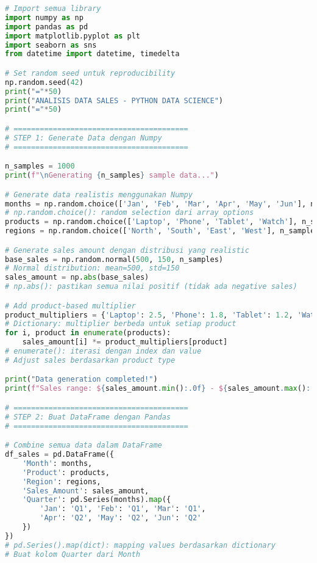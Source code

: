 \begin{lstlisting}[language=python, caption={Contoh Analisis Data Sales Lengkap}, style=python]
# Import semua library
import numpy as np
import pandas as pd
import matplotlib.pyplot as plt
import seaborn as sns
from datetime import datetime, timedelta

# Set random seed untuk reproducibility
np.random.seed(42)
print("="*50)
print("ANALISIS DATA SALES - PYTHON DATA SCIENCE")
print("="*50)

# ========================================
# STEP 1: Generate Data dengan Numpy
# ========================================

n_samples = 1000
print(f"\nGenerating {n_samples} sample data...")

# Generate data realistis menggunakan Numpy
months = np.random.choice(['Jan', 'Feb', 'Mar', 'Apr', 'May', 'Jun'], n_samples)
# np.random.choice(): random selection dari array options
products = np.random.choice(['Laptop', 'Phone', 'Tablet', 'Watch'], n_samples)
regions = np.random.choice(['North', 'South', 'East', 'West'], n_samples)

# Generate sales amount dengan distribusi yang realistic
base_sales = np.random.normal(500, 150, n_samples)
# Normal distribution: mean=500, std=150
sales_amount = np.abs(base_sales)
# np.abs(): pastikan semua nilai positif (tidak ada negative sales)

# Add product-based multiplier
product_multipliers = {'Laptop': 2.5, 'Phone': 1.8, 'Tablet': 1.2, 'Watch': 0.8}
# Dictionary: multiplier berbeda untuk setiap product
for i, product in enumerate(products):
    sales_amount[i] *= product_multipliers[product]
# enumerate(): iterasi dengan index dan value
# Adjust sales berdasarkan product type

print("Data generation completed!")
print(f"Sales range: ${sales_amount.min():.0f} - ${sales_amount.max():.0f}")

# ========================================
# STEP 2: Buat DataFrame dengan Pandas
# ========================================

# Combine semua data dalam DataFrame
df_sales = pd.DataFrame({
    'Month': months,
    'Product': products,
    'Region': regions,
    'Sales_Amount': sales_amount,
    'Quarter': pd.Series(months).map({
        'Jan': 'Q1', 'Feb': 'Q1', 'Mar': 'Q1',
        'Apr': 'Q2', 'May': 'Q2', 'Jun': 'Q2'
    })
})
# pd.Series().map(dict): mapping values berdasarkan dictionary
# Buat kolom Quarter dari Month


\end{lstlisting}
